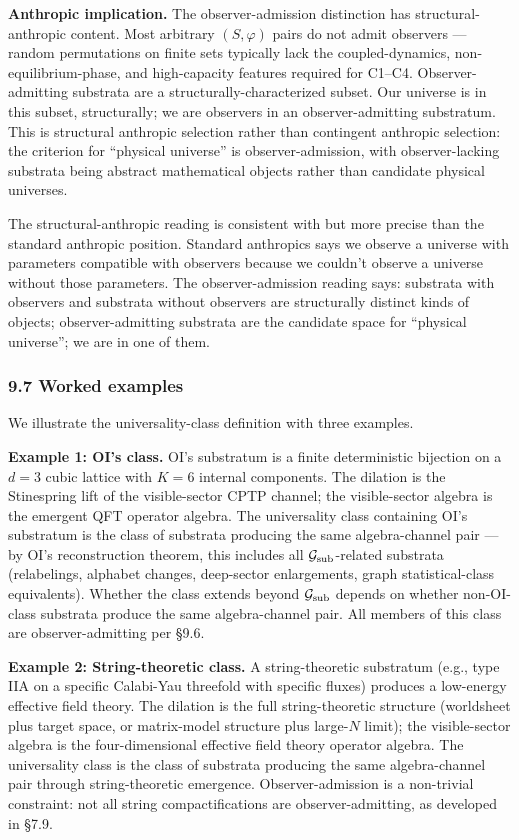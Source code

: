 \documentclass[
]{article}
\begin{document}
\textbf{Anthropic implication.} The observer-admission distinction has
structural-anthropic content. Most arbitrary \((S, \varphi)\) pairs do
not admit observers --- random permutations on finite sets typically
lack the coupled-dynamics, non-equilibrium-phase, and high-capacity
features required for C1--C4. Observer-admitting substrata are a
structurally-characterized subset. Our universe is in this subset,
structurally; we are observers in an observer-admitting substratum. This
is structural anthropic selection rather than contingent anthropic
selection: the criterion for ``physical universe'' is
observer-admission, with observer-lacking substrata being abstract
mathematical objects rather than candidate physical universes.

The structural-anthropic reading is consistent with but more precise
than the standard anthropic position. Standard anthropics says we
observe a universe with parameters compatible with observers because we
couldn't observe a universe without those parameters. The
observer-admission reading says: substrata with observers and substrata
without observers are structurally distinct kinds of objects;
observer-admitting substrata are the candidate space for ``physical
universe''; we are in one of them.

\hypertarget{worked-examples}{%
\subsubsection{9.7 Worked examples}\label{worked-examples}}

We illustrate the universality-class definition with three examples.

\textbf{Example 1: OI's class.} OI's substratum is a finite
deterministic bijection on a \(d=3\) cubic lattice with \(K=6\) internal
components. The dilation is the Stinespring lift of the visible-sector
CPTP channel; the visible-sector algebra is the emergent QFT operator
algebra. The universality class containing OI's substratum is the class
of substrata producing the same algebra-channel pair --- by OI's
reconstruction theorem, this includes all
\(\mathcal{G}_{\rm sub}\)-related substrata (relabelings, alphabet
changes, deep-sector enlargements, graph statistical-class equivalents).
Whether the class extends beyond \(\mathcal{G}_{\rm sub}\) depends on
whether non-OI-class substrata produce the same algebra-channel pair.
All members of this class are observer-admitting per §9.6.

\textbf{Example 2: String-theoretic class.} A string-theoretic
substratum (e.g., type IIA on a specific Calabi-Yau threefold with
specific fluxes) produces a low-energy effective field theory. The
dilation is the full string-theoretic structure (worldsheet plus target
space, or matrix-model structure plus large-\(N\) limit); the
visible-sector algebra is the four-dimensional effective field theory
operator algebra. The universality class is the class of substrata
producing the same algebra-channel pair through string-theoretic
emergence. Observer-admission is a non-trivial constraint: not all
string compactifications are observer-admitting, as developed in §7.9.
\end{document}
